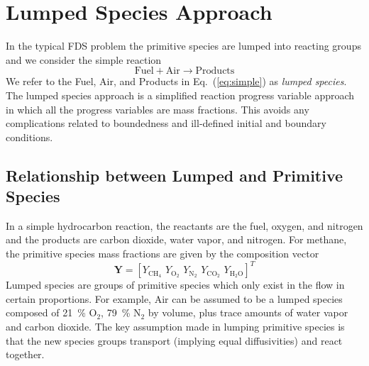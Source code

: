 \section{Lumped Species Approach}
\label{sec:lumpedspecies}

In the typical FDS problem the primitive species are lumped into reacting groups and we consider the simple reaction
\begin{equation}\label{eq:simple}
\mathrm{Fuel + Air \rightarrow Products}
\end{equation}
We refer to the Fuel, Air, and Products in Eq.~(\ref{eq:simple}) as \emph{lumped species}.  The lumped species approach is a simplified reaction progress variable approach~\cite{fox2003} in which all the progress variables are mass fractions. This avoids any complications related to boundedness and ill-defined initial and boundary conditions.

\subsection{Relationship between Lumped and Primitive Species}

In a simple hydrocarbon reaction, the reactants are the fuel, oxygen, and nitrogen and the products are carbon dioxide, water vapor, and nitrogen. For methane, the primitive species mass fractions are given by the composition vector
\begin{equation}\label{eq:prim_vector}
\mathbf{Y} = [Y_{\mathrm{CH}_4}\, \, Y_{\mathrm{O}_2}\, \, Y_{\mathrm{N}_2}\, \, Y_{\mathrm{CO}_2}\, \, Y_{\mathrm{H}_2\mathrm{O}}]^T
\end{equation}
Lumped species are groups of primitive species which only exist in the flow in certain proportions. For example, Air can be assumed to be a lumped species composed of 21~\% O$_2$, 79~\% N$_2$ by volume, plus trace amounts of water vapor and carbon dioxide. The key assumption made in lumping primitive species is that the new species groups transport (implying equal diffusivities) and react together.

